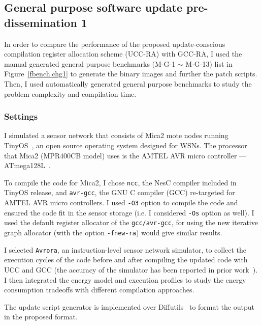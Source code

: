 \subsection{General purpose software update pre-dissemination 1}\label{exper-ra}

In order to compare the performance of the proposed update-conscious compilation register
allocation scheme (UCC-RA) with GCC-RA, I used the manual generated general purpose 
benchmarks (M-G-1 $\sim$ M-G-13) list in
Figure~\ref{fbench.chg1} to generate the binary images and further the patch scripts.
Then, I used automatically generated general purpose benchmarks to study the
problem complexity and compilation time.
\subsubsection{Settings}

I simulated a sensor network that consists of Mica2 mote nodes
\cite{mica2-power} running TinyOS~\cite{tinyos},  an open source
operating system designed for WSNs.  The processor that Mica2
(MPR400CB model) uses is the AMTEL AVR micro controller ---
ATmega128L~\cite{atmega128L}.  

To compile the code for Mica2, I chose {\tt ncc}, the NesC compiler
included in TinyOS release, and {\tt avr-gcc}, the GNU C compiler
(GCC) re-targeted for AMTEL AVR micro controllers. I used {\tt -O3}
option to compile the code and ensured the code fit in the sensor
storage (i.e. I considered {\tt -Os} option as well).  I used the
default register allocator of the {\tt gcc/avr-gcc}, for using the new
iterative graph allocator (with the option {\tt -fnew-ra}) would give
similar results.

I selected {\tt Avrora}, an instruction-level sensor network
simulator, to collect the execution cycles of the code before and
after compiling the updated code with UCC and GCC (the accuracy of the
simulator has been reported in prior work~\cite{avrora}). I then
integrated the energy model and execution profiles to study the energy
consumption tradeoffs with different compilation approaches.

The update script generator is implemented over Diffutils~\cite{diff}
to format the output in the proposed format.



